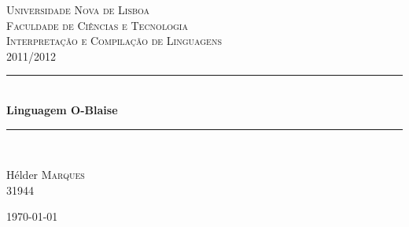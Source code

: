 \begin{titlepage}

\begin{center}


\textsc{\Large Universidade Nova de Lisboa \\ Faculdade de Ciências e Tecnologia}\\[5cm]
\textsc{\Large Interpretação e Compilação de Linguagens \\ 2011/2012}\\[0.5cm]

\newcommand{\HRule}{\rule{\linewidth}{0.5mm}}
\HRule \\[0.4cm]
{ \huge \bfseries Linguagem O-Blaise \\[0.2cm]}
\HRule \\[1.5cm]


\begin{minipage}{0.4\textwidth}
\begin{flushleft} \large

\end{flushleft}
\end{minipage}
\begin{minipage}{0.4\textwidth}
\begin{flushright} \large
Hélder \textsc{Marques}\\
31944\\
\end{flushright}
\end{minipage}

\vfill

{\large \today}

\end{center}

\end{titlepage}
